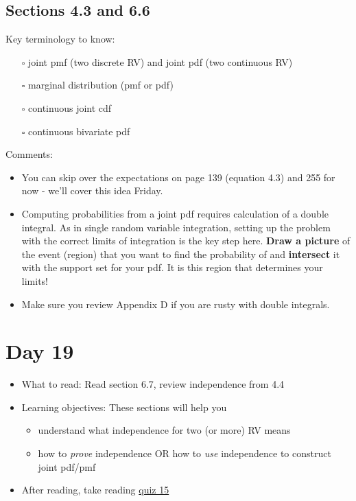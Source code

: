 \documentclass[
  letterpaper,
]{scrbook}
\providecommand{\tightlist}{%
  \setlength{\itemsep}{0pt}\setlength{\parskip}{0pt}}\usepackage{longtable,booktabs,array}
\begin{document}
\subsection*{Sections 4.3 and 6.6}\label{sections-4.3-and-6.6}

Key terminology to know:

\begin{itemize}
\tightlist
\item[$\square$]
  joint pmf (two discrete RV) and joint pdf (two continuous RV)
\item[$\square$]
  marginal distribution (pmf or pdf)
\item[$\square$]
  continuous joint cdf
\item[$\square$]
  continuous bivariate pdf
\end{itemize}

Comments:

\begin{itemize}
\tightlist
\item
  You can skip over the expectations on page 139 (equation 4.3) and 255
  for now - we'll cover this idea Friday.
\item
  Computing probabilities from a joint pdf requires calculation of a
  double integral. As in single random variable integration, setting up
  the problem with the correct limits of integration is the key step
  here. \textbf{Draw a picture} of the event (region) that you want to
  find the probability of and \textbf{intersect} it with the support set
  for your pdf. It is this region that determines your limits!
\item
  Make sure you review Appendix D if you are rusty with double
  integrals.
\end{itemize}

\section*{Day 19}\label{day-19}


\begin{itemize}
\item
  What to read: Read section 6.7, review independence from 4.4
\item
  Learning objectives: These sections will help you

  \begin{itemize}
  \tightlist
  \item
    understand what independence for two (or more) RV means
  \item
    how to \emph{prove} independence OR how to \emph{use} independence
    to construct joint pdf/pmf
  \end{itemize}
\item
  After reading, take reading
  \href{https://forms.gle/UvGofRr38VkZCCtf7}{quiz 15}
\end{itemize}
\end{document}
